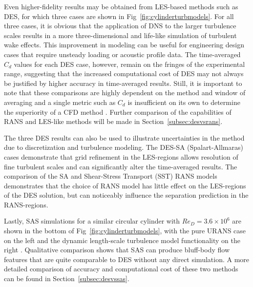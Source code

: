 \documentclass[journal]{new-aiaa}
\begin{document}
Even higher-fidelity results may be obtained from LES-based methods such as DES, for which three cases are shown in Fig~\ref{fig:cylinderturbmodels}. For all three cases, it is obvious that the application of DNS to the larger turbulence scales results in a more three-dimensional and life-like simulation of turbulent wake effects. This improvement in modeling can be useful for engineering design cases that require unsteady loading or acoustic profile data. The time-averaged $C_d$ values for each DES case, however, remain on the fringes of the experimental range, suggesting that the increased computational cost of DES may not always be justified by higher accuracy in time-averaged results. Still, it is important to note that these comparisons are highly dependent on the method and window of averaging and a single metric such as $C_d$ is insufficient on its own to determine the superiority of a CFD method \cite{travin2000detachededdy}. Further comparison of the capabilities of RANS and LES-like methods will be made in Section~\ref{subsec:desvsrans}.




The three DES results can also be used to illustrate uncertainties in the method due to discretization and turbulence modeling. The DES-SA (Spalart-Allmaras) cases demonstrate that grid refinement in the LES-regions allows resolution of fine turbulent scales and can significantly alter the time-averaged results. The comparison of the SA and Shear-Stress Transport (SST) RANS models demonstrates that the choice of RANS model has little effect on the LES-regions of the DES solution, but can noticeably influence the separation prediction in the RANS-regions.

Lastly, SAS simulations for a similar circular cylinder with $Re_D=3.6 \times 10^6$ are shown in the bottom of Fig~\ref{fig:cylinderturbmodels}, with the pure URANS case on the left and the dynamic length-scale turbulence model functionality on the right \cite{menter2005scaleadaptive}. Qualitative comparison shows that SAS can produce bluff-body flow features that are quite comparable to DES without any direct simulation. A more detailed comparison of accuracy and computational cost of these two methods can be found in Section~\ref{subsec:desvssas}.
\end{document}
